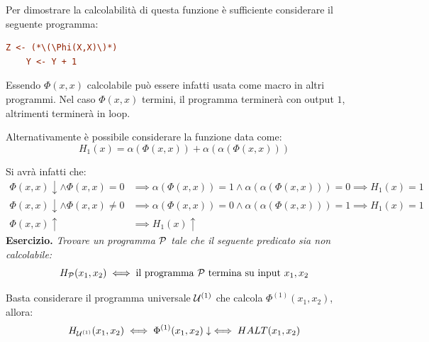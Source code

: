 Per dimostrare la calcolabilità di questa funzione è sufficiente considerare il seguente programma:
\begin{lstlisting}[language=ini, label={Programma H1},  caption=Programma H1]
    Z <- (*\(\Phi(X,X)\)*)
    Y <- Y + 1
\end{lstlisting}

Essendo \(\Phi(x,x)\) calcolabile può essere infatti usata come macro in altri programmi.  Nel caso \(\Phi(x,x)\) termini, il programma terminerà con output \(1\), altrimenti terminerà in loop.

Alternativamente è possibile considerare la funzione data come:
\begin{equation}
    H_1(x)=\alpha(\Phi(x,x)) + \alpha(\alpha(\Phi(x,x)))
\end{equation}

Si avrà infatti che:
\begin{equation}
    \begin{split}
        \Phi(x,x)\downarrow \land \Phi(x,x)=0 &\implies \alpha(\Phi(x,x))=1 \land \alpha(\alpha(\Phi(x,x)))=0 \implies H_1(x)=1\\
        \Phi(x,x)\downarrow \land \Phi(x,x)\neq0 &\implies \alpha(\Phi(x,x))=0 \land \alpha(\alpha(\Phi(x,x)))=1 \implies H_1(x)=1\\
        \Phi(x,x)\uparrow & \implies H_1(x)\uparrow
    \end{split}
\end{equation}
\textbf{Esercizio. } \textit{Trovare un programma \(\mathcal{P}\) tale che il seguente predicato sia non calcolabile:}
\begin{equation}
    H_{\mathcal{P}}(x_1,x_2) \iff \text{il programma \(\mathcal{P}\) termina su input \(x_1,x_2\)}
\end{equation}

Basta considerare il programma universale \(\mathcal{U}^{(1)}\) che calcola \(\Phi^{(1)}(x_1,x_2)\), allora:
\begin{equation}
    H_{\mathcal{U}^{(1)}}(x_1,x_2) \iff \Phi^{(1)}(x_1,x_2)\downarrow \iff HALT(x_1,x_2)
\end{equation}
